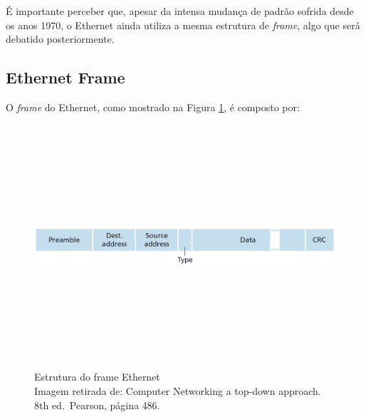 É importante perceber que, apesar da intensa mudança de padrão sofrida
desde os anos 1970, o Ethernet ainda utiliza a mesma estrutura de
\emph{frame}, algo que será debatido posteriormente.

\hypertarget{ethernet-frame}{%
\subsection{Ethernet Frame}\label{ethernet-frame}}

O \emph{frame} do Ethernet, como mostrado na Figura \ref{Estrutura do frame Ethernet}, é composto por:


\begin{figure}[h!]
\centering
\includegraphics[keepaspectratio, width=12cm, height=9cm]{imagens/13/13 - estrutura do frame ethernet.png}
\caption{Estrutura do frame Ethernet \\
Imagem retirada de: Computer Networking a top-down approach. 8th
ed.~Pearson, página 486. \\}
\label{Estrutura do frame Ethernet}
\end{figure}


